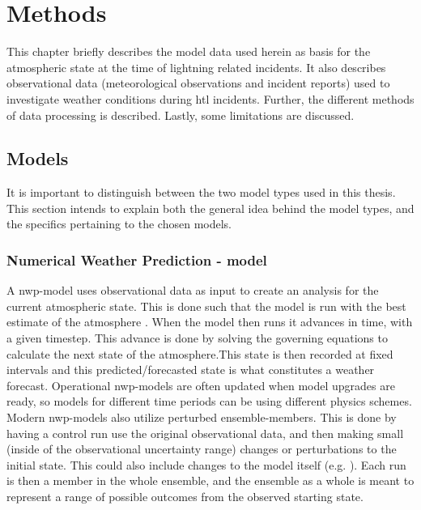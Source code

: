 \setcounter{chapter}{2}
\chapter{Methods}

This chapter briefly describes the model data used herein as basis for the atmospheric state at the time of lightning related incidents. It also describes observational data (meteorological observations and incident reports) used to investigate weather conditions during \acrshort{htl} incidents. Further, the different methods of data processing is described. Lastly, some limitations are discussed.

\section{Models}\label{sec:models}

It is important to distinguish between the two model types used in this thesis. This section intends to explain both the general idea behind the model types, and the specifics pertaining to the chosen models.

\subsection{Numerical Weather Prediction - model}\label{sec:nwp}

A \acrfull{nwp}-model uses observational data as input to create an analysis for the current atmospheric state. This is done such that the model is run with the best estimate of the atmosphere . When the model then runs it advances in time, with a given timestep. This advance is done by solving the governing equations to calculate the next state of the atmosphere.This state is then recorded at fixed intervals and this predicted/forecasted state is what constitutes a weather forecast. Operational \acrshort{nwp}-models are often updated when model upgrades are ready, so models for different time periods can be using different physics schemes. Modern \acrshort{nwp}-models also utilize perturbed ensemble-members. This is done by having a control run use the original observational data, and then making small (inside of the observational uncertainty range) changes or perturbations to the initial state. This could also include changes to the model itself (e.g. \cite{toth1993}). Each run is then a member in the whole ensemble, and the ensemble as a whole is meant to represent a range of possible outcomes from the observed starting state.

